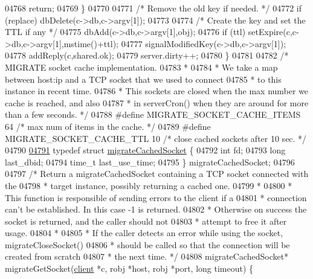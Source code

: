 \begin{DoxyCode}
{{{{{{{{{{{{{{{{{{{{{{{{{{{{{{{{{{{{{{{{{{{{{{{{{{{{{{{{{{{{{{{{{{{{{{{{{{{{{{{{{{{{{{{{{{{{{{{{{{{{{{{{{{04768         \textcolor{keywordflow}{return};
04769     \}
04770 
04771     \textcolor{comment}{/* Remove the old key if needed. */}
04772     \textcolor{keywordflow}{if} (replace) dbDelete(c->db,c->argv[1]);
04773 
04774     \textcolor{comment}{/* Create the key and set the TTL if any */}
04775     dbAdd(c->db,c->argv[1],obj);
04776     \textcolor{keywordflow}{if} (ttl) setExpire(c,c->db,c->argv[1],mstime()+ttl);
04777     signalModifiedKey(c->db,c->argv[1]);
04778     addReply(c,shared.ok);
04779     server.dirty++;
04780 \}
04781 
04782 \textcolor{comment}{/* MIGRATE socket cache implementation.}
04783 \textcolor{comment}{ *}
04784 \textcolor{comment}{ * We take a map between host:ip and a TCP socket that we used to connect}
04785 \textcolor{comment}{ * to this instance in recent time.}
04786 \textcolor{comment}{ * This sockets are closed when the max number we cache is reached, and also}
04787 \textcolor{comment}{ * in serverCron() when they are around for more than a few seconds. */}
04788 \textcolor{preprocessor}{#}\textcolor{preprocessor}{define} \textcolor{preprocessor}{MIGRATE\_SOCKET\_CACHE\_ITEMS} 64 \textcolor{comment}{/* max num of items in the cache. */}
04789 \textcolor{preprocessor}{#}\textcolor{preprocessor}{define} \textcolor{preprocessor}{MIGRATE\_SOCKET\_CACHE\_TTL} 10 \textcolor{comment}{/* close cached sockets after 10 sec. */}
04790 
\hyperlink{structmigrateCachedSocket}{04791} \textcolor{keyword}{typedef} \textcolor{keyword}{struct} \hyperlink{structmigrateCachedSocket}{migrateCachedSocket} \{
04792     \textcolor{keywordtype}{int} fd;
04793     \textcolor{keywordtype}{long} last\_dbid;
04794     time\_t last\_use\_time;
04795 \} migrateCachedSocket;
04796 
04797 \textcolor{comment}{/* Return a migrateCachedSocket containing a TCP socket connected with the}
04798 \textcolor{comment}{ * target instance, possibly returning a cached one.}
04799 \textcolor{comment}{ *}
04800 \textcolor{comment}{ * This function is responsible of sending errors to the client if a}
04801 \textcolor{comment}{ * connection can't be established. In this case -1 is returned.}
04802 \textcolor{comment}{ * Otherwise on success the socket is returned, and the caller should not}
04803 \textcolor{comment}{ * attempt to free it after usage.}
04804 \textcolor{comment}{ *}
04805 \textcolor{comment}{ * If the caller detects an error while using the socket, migrateCloseSocket()}
04806 \textcolor{comment}{ * should be called so that the connection will be created from scratch}
04807 \textcolor{comment}{ * the next time. */}
04808 migrateCachedSocket* migrateGetSocket(\hyperlink{structclient}{client} *c, robj *host, robj *port, \textcolor{keywordtype}{long} timeout) \{
}}}}}}}}}}}}}}}}}}}}}}}}}}}}}}}}}}}}}}}}}}}}}}}}}}}}}}}}}}}}}}}}}}}}}}}}}}}}}}}}}}}}}}}}}}}}}}}}}}}}}}}}}}
\end{DoxyCode}
